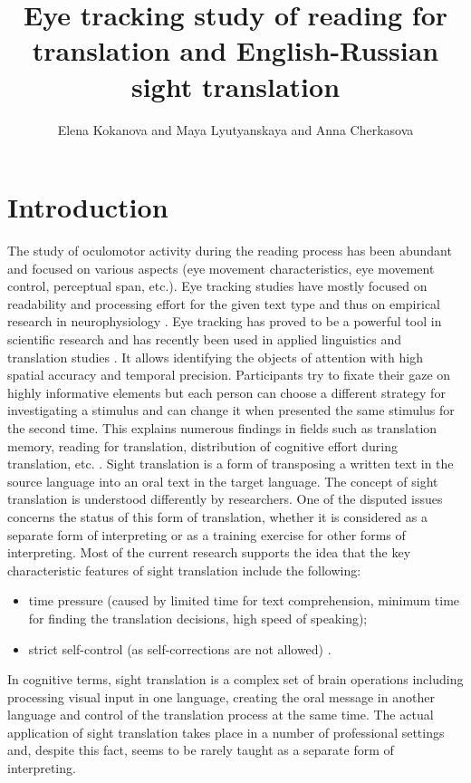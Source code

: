 \documentclass[output=paper]{langscibook}
\author{Elena Kokanova\affiliation{Northern (Arctic) Federal University} and Maya Lyutyanskaya\affiliation{Northern (Arctic) Federal University} and  Anna Cherkasova\affiliation{Northern (Arctic) Federal University}}
\title[Eye tracking study of reading for translation and ENG/RUS sight translation]{Eye tracking study of reading for translation and English-Russian sight translation}
\begin{document}
\renewcommand{\lsChapterFooterSize}{\footnotesize}
\maketitle
\section{Introduction} 
The study of oculomotor activity during the reading process has been abundant and focused on various aspects (eye movement characteristics, eye movement control, perceptual span, etc.). Eye tracking studies have mostly focused on readability and processing effort for the given text type and thus on empirical research in neurophysiology \citep{Jakobsen2008, Schnitzer2006, Clifton2016}. Eye tracking has proved to be a powerful tool in scientific research and has recently been used in applied linguistics and translation studies \citep{Hansen-Schirra2016}. It allows identifying the objects of attention with high spatial accuracy and temporal precision. Participants try to fixate their gaze on highly informative elements but each person can choose a different strategy for investigating a stimulus and can change it when presented the same stimulus for the second time. This explains numerous findings in fields such as translation memory, reading for translation, distribution of cognitive effort during translation, etc. \citep{hvelplund2014eye}.  
Sight translation is a form of transposing a written text in the source language into an oral text in the target language. The concept of sight translation is understood differently by researchers. One of the disputed issues concerns the status of this form of translation, whether it is considered as a separate form of interpreting or as a training exercise for other forms of interpreting. Most of the current research supports the idea that the key characteristic features of sight translation include the following:

\begin{itemize}
    \item{time pressure (caused by limited time for text comprehension, minimum time for finding the translation decisions, high speed of speaking);} 
    \item{strict self-control (as self-corrections are not allowed) \citep{Chmiel2013, Kokanova2016,Thawabteh2015}.}
\end{itemize}
In cognitive terms, sight translation is a complex set of brain operations including processing visual input in one language, creating the oral message in another language and control of the translation process at the same time. The actual application of sight translation takes place in a number of professional settings and, despite this fact, seems to be rarely taught as a separate form of interpreting. 
\end{document}
